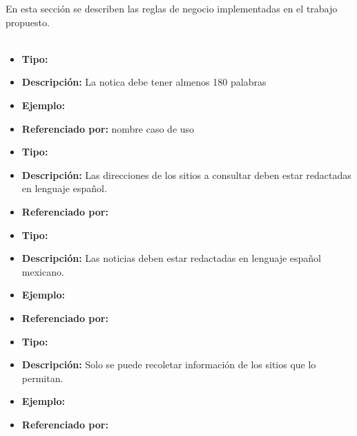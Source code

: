 
  
  En esta sección se describen las reglas de negocio implementadas en el trabajo propuesto.\\\\


  \begin{itemize}
    \item \textbf{Tipo:}  
    \item \textbf{Descripción:}  La notica debe tener almenos 180 palabras
    \item \textbf{Ejemplo:}
    \item \textbf{Referenciado por:} nombre caso de uso \\
  \end{itemize}


  \begin{itemize}
    \item \textbf{Tipo:}  
    \item \textbf{Descripción:} Las direcciones de los sitios a consultar deben estar redactadas en lenguaje español.
    \item \textbf{Referenciado por:}  \\
  \end{itemize}


  \begin{itemize}
    \item \textbf{Tipo:}  
    \item \textbf{Descripción:} Las noticias deben estar redactadas en lenguaje español mexicano.
    \item \textbf{Ejemplo:}
    \item \textbf{Referenciado por:}  \\
  \end{itemize}


  \begin{itemize}
    \item \textbf{Tipo:}  
    \item \textbf{Descripción:} Solo se puede recoletar información de los sitios que lo permitan.
    \item \textbf{Ejemplo:}
    \item \textbf{Referenciado por:}  \\
  \end{itemize}

